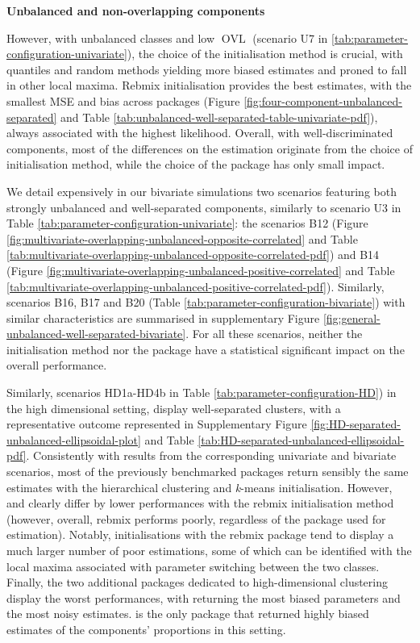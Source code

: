 \textbf{Unbalanced and non-overlapping components}

However, with unbalanced classes and low \(\operatorname{OVL}\) (scenario U7 in
\ref{tab:parameter-configuration-univariate}), the choice of the
initialisation method is crucial, with quantiles and random
methods yielding more biased estimates and proned to fall in other local
maxima. Rebmix initialisation provides the best estimates, with the
smallest MSE and bias across packages (Figure
\ref{fig:four-component-unbalanced-separated} and Table
\ref{tab:unbalanced-well-separated-table-univariate-pdf}),
always associated with the highest likelihood. Overall, with
well-discriminated components, most of the differences on the estimation
originate from the choice of initialisation method, while the choice of
the package has only small impact.

We detail expensively in our bivariate simulations two scenarios featuring both strongly unbalanced and well-separated components, similarly to scenario U3 in Table \ref{tab:parameter-configuration-univariate}: the scenarios B12 (Figure \ref{fig:multivariate-overlapping-unbalanced-opposite-correlated} and Table \ref{tab:multivariate-overlapping-unbalanced-opposite-correlated-pdf}) and B14 (Figure \ref{fig:multivariate-overlapping-unbalanced-positive-correlated} and Table \ref{tab:multivariate-overlapping-unbalanced-positive-correlated-pdf}). Similarly, scenarios B16, B17 and B20 (Table \ref{tab:parameter-configuration-bivariate}) with similar characteristics are summarised in supplementary Figure \ref{fig:general-unbalanced-well-separated-bivariate}. For all these scenarios, neither the initialisation method nor the package have a statistical significant impact on the overall performance.

\color{blue}

Similarly, scenarios HD1a-HD4b in Table \ref{tab:parameter-configuration-HD}) in the high dimensional setting, display well-separated clusters, with a representative outcome represented in Supplementary Figure \ref{fig:HD-separated-unbalanced-ellipsoidal-plot} and Table \ref{tab:HD-separated-unbalanced-ellipsoidal-pdf}. Consistently with results from the corresponding univariate and bivariate scenarios, most of the previously benchmarked packages return sensibly the same estimates with the hierarchical clustering and \emph{k}-means initialisation. However,  and  clearly differ by lower performances with the rebmix initialisation method (however, overall, rebmix performs poorly, regardless of the package used for estimation). Notably, initialisations with the rebmix package tend to display a much larger number of poor estimations, some of which can be identified with the local maxima associated with parameter switching between the two classes. Finally, the two additional packages dedicated to high-dimensional clustering display the worst performances, with  returning the most biased parameters and  the most noisy estimates.  is the only package that returned highly biased estimates of the components' proportions in this setting.
\color{black}

